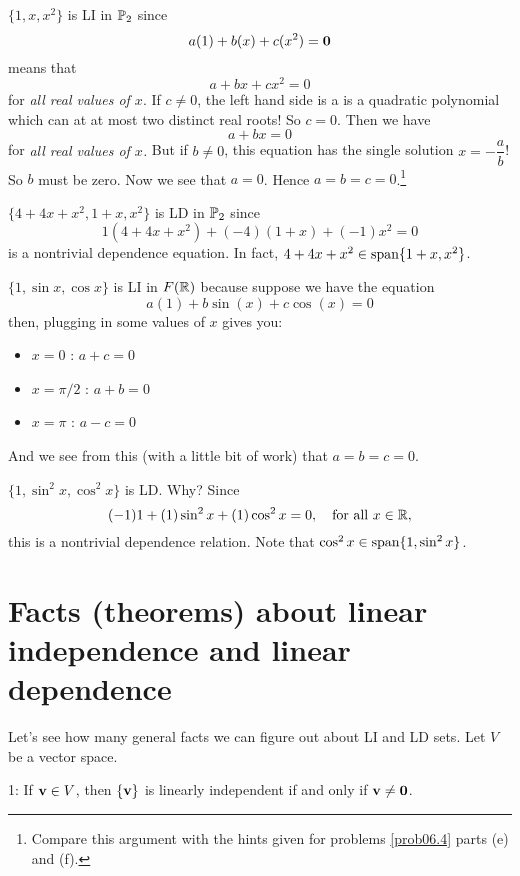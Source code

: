 \begin{myexample}\label{imp} $\{ 1,x,x^2\}$ is LI in $\mathbb{P}_2$ since
$$
a(1) + b(x) + c(x^2) = \mathbf{0} 
$$
means that $$
a  + bx + c x^2  = 0 
$$ for {\it all real values of $x$}. If $c\not=0$, the left hand side is a is a quadratic polynomial which can at at most two distinct real roots! So $c=0$. Then we have $$
a  + bx  = 0 
$$ for {\it all real values of $x$.} But if $b\not=0$, this equation has the single solution $x=-\dfrac{a}{b}$! So $b$ must be zero. Now we see that $a=0$. Hence $a=b=c=0$.\footnote{Compare this argument with the hints given for problems \ref{prob06.4} parts (e) and (f).} \end{myexample}

\begin{myexample} $\{ 4+4x+x^2, 1+x, x^2\}$ is LD in $\mathbb{P}_2$ since
$$
1(4+4x+x^2) +(-4)(1+x) + (-1)x^2 = 0
$$
is a nontrivial dependence equation.  In fact, $4+4x+x^2 \in \textrm{span}\{ 1+x, x^2\}$.
\end{myexample}

\begin{myexample} $\{ 1, \sin x, \cos x\}$ is LI in $F(\mathbb{R})$ because suppose we
have the equation
$$
a(1) + b\sin(x) + c\cos(x) = 0
$$
then, plugging in some values of $x$ gives you:
\begin{itemize}
\item $x=0$ : $a+c = 0$
\item $x=\pi/2$ : $a+b = 0$
\item $x=\pi$ : $a-c = 0$
\end{itemize}
And we see from this (with a little bit of work) that $a=b=c=0$. \end{myexample}


\begin{myexample} $\{1, \sin^2 x, \cos^2 x\}$ is LD.  Why?  Since
$$
(-1) 1 + (1) \sin^2 x + (1) \cos^2 x = 0,  \quad \textrm{for all $x\in \mathbb{R}$},
$$
this is a nontrivial dependence relation.  Note that $\cos^2 x \in \textrm{span}\{1,\sin^2 x\}$.
\end{myexample}

\section[Facts about linear dependence and linear independence]{Facts (theorems) about linear independence and linear dependence}
Let's see how many general facts we can figure out about LI and LD sets. Let $V$ be a vector space.


\begin{fac}1:  If $\mathbf{v} \in V$, then $\{ \mathbf{v} \}$ is linearly independent if and only if $\mathbf{v} \neq \mathbf{0}$.  \end{fac}

